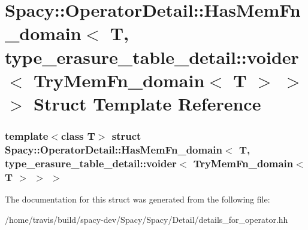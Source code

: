 \hypertarget{structSpacy_1_1OperatorDetail_1_1HasMemFn__domain_3_01T_00_01type__erasure__table__detail_1_1voi37007be089abe59e98d49f96532590a3}{\section{\-Spacy\-:\-:\-Operator\-Detail\-:\-:\-Has\-Mem\-Fn\-\_\-domain$<$ \-T, type\-\_\-erasure\-\_\-table\-\_\-detail\-:\-:voider$<$ \-Try\-Mem\-Fn\-\_\-domain$<$ \-T $>$ $>$ $>$ \-Struct \-Template \-Reference}
\label{structSpacy_1_1OperatorDetail_1_1HasMemFn__domain_3_01T_00_01type__erasure__table__detail_1_1voi37007be089abe59e98d49f96532590a3}
}
\subsubsection*{template$<$class T$>$ struct Spacy\-::\-Operator\-Detail\-::\-Has\-Mem\-Fn\-\_\-domain$<$ T, type\-\_\-erasure\-\_\-table\-\_\-detail\-::voider$<$ Try\-Mem\-Fn\-\_\-domain$<$ T $>$ $>$ $>$}



\-The documentation for this struct was generated from the following file\-:\begin{DoxyCompactItemize}
\item 
/home/travis/build/spacy-\/dev/\-Spacy/\-Spacy/\-Detail/details\-\_\-for\-\_\-operator.\-hh\end{DoxyCompactItemize}
